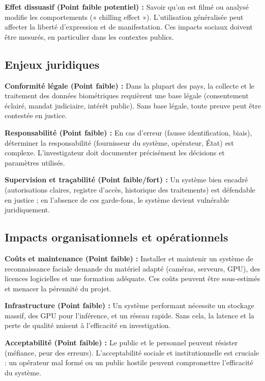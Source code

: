 \documentclass[11pt,a4paper]{article}
\begin{document}
	\textbf{Effet dissuasif (Point faible potentiel) :} Savoir qu’on est filmé ou analysé modifie les comportements (« chilling effect »). L’utilisation généralisée peut affecter la liberté d’expression et de manifestation. Ces impacts sociaux doivent être mesurés, en particulier dans les contextes publics.
	\vspace{0.5cm}
	\subsection{Enjeux juridiques}
	\textbf{Conformité légale (Point faible) :} Dans la plupart des pays, la collecte et le traitement des données biométriques requièrent une base légale (consentement éclairé, mandat judiciaire, intérêt public). Sans base légale, toute preuve peut être contestée en justice.
	
	\textbf{Responsabilité (Point faible) :} En cas d’erreur (fausse identification, biais), déterminer la responsabilité (fournisseur du système, opérateur, État) est complexe. L’investigateur doit documenter précisément les décisions et paramètres utilisés.
	
	\textbf{Supervision et traçabilité (Point faible/fort) :} Un système bien encadré (autorisations claires, registre d’accès, historique des traitements) est défendable en justice ; en l’absence de ces garde-fous, le système devient vulnérable juridiquement.
	\vspace{0.5cm}
	\subsection{Impacts organisationnels et opérationnels}
	\textbf{Coûts et maintenance (Point faible) :} Installer et maintenir un système de reconnaissance faciale demande du matériel adapté (caméras, serveurs, GPU), des licences logicielles et une formation adéquate. Ces coûts peuvent être sous-estimés et menacer la pérennité du projet.
	
	\textbf{Infrastructure (Point faible) :} Un système performant nécessite un stockage massif, des GPU pour l’inférence, et un réseau rapide. Sans cela, la latence et la perte de qualité nuisent à l’efficacité en investigation.
	
	\textbf{Acceptabilité (Point faible) :} Le public et le personnel peuvent résister (méfiance, peur des erreurs). L’acceptabilité sociale et institutionnelle est cruciale : un opérateur mal formé ou un public hostile peuvent compromettre l’efficacité du système.
	\vspace{0.5cm}
\end{document}
